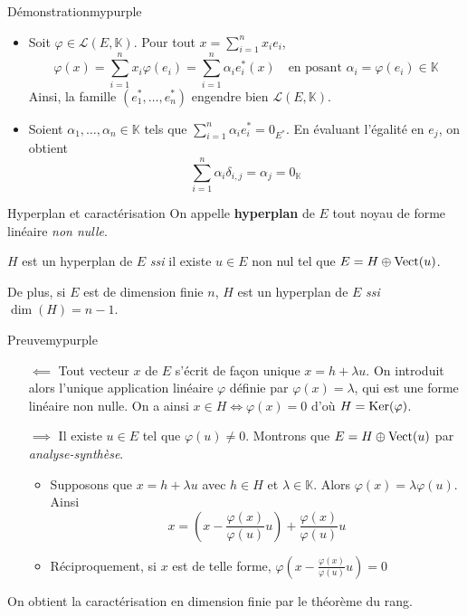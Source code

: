     \begin{demo}{Démonstration}{mypurple}
        \begin{itemize}
            \item Soit $\varphi \in \mathcal{L}(E,\mathbb{K})$. Pour tout $x = \sum_{i=1}^{n} x_i e_i$, 
            \[ \varphi(x) = \sum_{i=1}^{n} x_i \varphi(e_i) = \sum_{i=1}^{n} \alpha_i e_i^*(x) \quad \text{en posant } \alpha_i = \varphi(e_i) \in \mathbb{K} \]    
            Ainsi, la famille $(e_1^*, \ldots, e_n^*)$ engendre bien $\mathcal{L}(E,\mathbb{K})$.
            \item Soient $\alpha_1,\ldots,\alpha_n \in \mathbb{K}$ tels que $\sum_{i=1}^{n} \alpha_i e_i^* = 0_{E^*}$. En évaluant l’égalité en $e_j$, on obtient 
            \[ \sum_{i=1}^{n} \alpha_i \delta_{i,j} = \alpha_j = 0_{\mathbb{K}} \]   
        \end{itemize}
    \end{demo}

    \begin{defitheo}{Hyperplan et caractérisation}{}
        On appelle \textbf{hyperplan} de $E$ tout noyau de forme linéaire \textit{non nulle}. 

        $H$ est un hyperplan de $E$ \textit{ssi} il existe $u \in E$ non nul tel que $E = H \oplus \operatorname{Vect}(u)$.

        De plus, si $E$ est de dimension finie $n$, $H$ est un hyperplan de $E$ \textit{ssi} $\dim(H) = n-1$.
    \end{defitheo}

    \begin{demo}{Preuve}{mypurple}
        \begin{itemize}
            \item[\textcolor{mypurple}{$\impliedby$}] Tout vecteur $x$ de $E$ s’écrit de façon unique $x = h + \lambda u$. On introduit alors l’unique application linéaire $\varphi$ définie par $\varphi(x) = \lambda$, qui est une forme linéaire non nulle. On a ainsi $x \in H \iff \varphi(x) = 0$ d’où $H = \operatorname{Ker}(\varphi)$.
            \item[\textcolor{mypurple}{$\implies$}] Il existe $u \in E$ tel que $\varphi(u) \neq 0$.  Montrons que $E = H \oplus \operatorname{Vect}(u)$ par \textit{analyse-synthèse}.
            \begin{itemize}
                \item Supposons que $x = h + \lambda u$ avec $h \in H$ et $\lambda \in \mathbb{K}$. Alors $\varphi(x) = \lambda \varphi(u)$. Ainsi 
                \[ x = \left( x - \frac{\varphi(x)}{\varphi(u)}u \right) + \frac{\varphi(x)}{\varphi(u)}u \]    
                \item Réciproquement, si $x$ est de telle forme, $\varphi\left( x - \frac{\varphi(x)}{\varphi(u)}u \right) = 0$ 
            \end{itemize}
        \end{itemize}
        On obtient la caractérisation en dimension finie par le théorème du rang.
    \end{demo}
    
